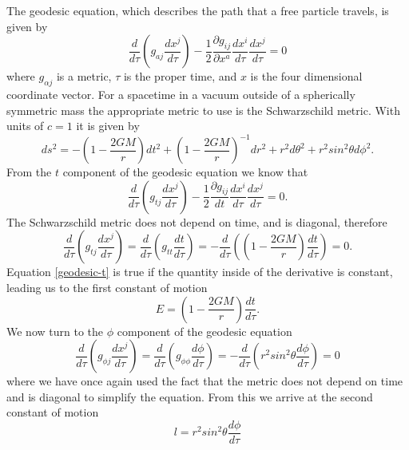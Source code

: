 \documentclass[a4paper,12pt]{article}
\begin{document}
The geodesic equation, which describes the path that a free particle travels, is given by
\begin{equation} \label{geodesic}
\frac{d}{d\tau}(g_{aj} \frac{dx^j}{d\tau})-\frac{1}{2}\frac{\partial g_{ij}}{\partial x^a} \frac{dx^i}{d\tau}\frac{dx^j}{d\tau} = 0
\end{equation}
where $g_{\alpha j}$ is a metric, $\tau$ is the proper time, and $x$ is the four dimensional coordinate vector. For a spacetime in a vacuum outside of a spherically symmetric mass the appropriate metric to use is the Schwarzschild metric.  With units of $c=1$ it is given by
\begin{equation} \label{s-metric}
ds^2 = -(1-\frac{2GM}{r})dt^2 + (1-\frac{2GM}{r})^{-1}dr^2+r^2 d \theta^2 + r^2 sin^2 \theta d\phi^2.
\end{equation}
From the $t$ component of the geodesic equation we know that
\begin{equation} \label{geodesic-t}
\frac{d}{d \tau}(g_{tj}\frac{dx^j}{d\tau}) - \frac{1}{2} \frac{\partial g_{ij}}{dt} \frac{dx^i}{d\tau} \frac{dx^j}{d \tau} =0.
\end{equation}
The Schwarzschild metric does not depend on time, and is diagonal, therefore
\begin{equation} \label{geodesic-t-reduced}
\frac{d}{d \tau}(g_{tj}\frac{dx^j}{d\tau}) = \frac{d}{d \tau}(g_{tt}\frac{dt}{d\tau}) = -\frac{d}{d \tau}((1-\frac{2GM}{r})\frac{dt}{d\tau}) = 0.
\end{equation}
Equation \ref{geodesic-t} is true if the quantity inside of the derivative is constant, leading us to the first constant of motion
\begin{equation}\label{first com}
E=(1-\frac{2GM}{r})\frac{dt}{d\tau}.
\end{equation}
We now turn to the $\phi$ component of the geodesic equation
\begin{equation} \label{geodesic-phi}
\frac{d}{d \tau}(g_{\phi j}\frac{dx^j}{d\tau}) = \frac{d}{d \tau}(g_{\phi \phi}\frac{d\phi}{d\tau}) = -\frac{d}{d \tau}(r^2 sin^2 \theta \frac{d\phi}{d\tau}) = 0
\end{equation}
where we have once again used the fact that the metric does not depend on time and is diagonal to simplify the equation.  From this we arrive at the second constant of motion
\begin{equation} \label{second com}
l=r^2sin^2\theta \frac{d\phi}{d \tau}
\end{equation}
\end{document}
